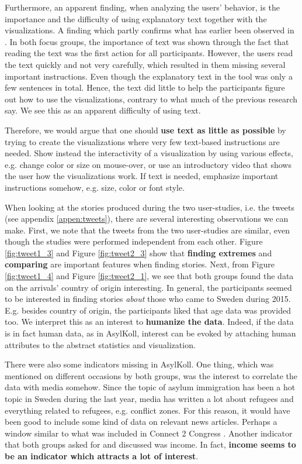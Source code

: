\documentclass{acmtog} %
\begin{document}
Furthermore, an apparent finding, when analyzing the users' behavior, is the importance and the difficulty of using explanatory text together with the visualizations. A finding which partly confirms what has earlier been observed in \citet{borkin2016beyond,segel2010narrative}. In both focus groups, the importance of text was shown through the fact that reading the text was the first action for all participants. However, the users read the text quickly and not very carefully, which resulted in them missing several important instructions. Even though the explanatory text in the tool was only a few sentences in total. Hence, the text did little to help the participants figure out how to use the visualizations, contrary to what much of the previous research say. We see this as an apparent difficulty of using text.

Therefore, we would argue that one should \textbf{use text as little as possible} by trying to create the visualizations where very few text-based instructions are needed. Show instead the interactivity of a visualization by using various effects, e.g. change color or size on mouse-over, or use an introductory video that shows the user how the visualizations work. If text is needed, emphasize important instructions somehow, e.g. size, color or font style.

When looking at the stories produced during the two user-studies, i.e. the tweets (see appendix \ref{appen:tweets}), there are several interesting observations we can make. First, we note that the tweets from the two user-studies are similar, even though the studies were performed independent from each other. Figure \ref{fig:tweet1_3} and Figure \ref{fig:tweet2_3} show that \textbf{finding extremes} and \textbf{comparing} are important features when finding stories. Next, from Figure \ref{fig:tweet1_4} and Figure \ref{fig:tweet2_1}, we see that both groups found the data on the arrivals' country of origin interesting. In general, the participants seemed to be interested in finding stories \emph{about} those who came to Sweden during 2015. E.g. besides country of origin, the participants liked that age data was provided too. We interpret this as an interest to \textbf{humanize the data}. Indeed, if the data is in fact human data, as in AsylKoll, interest can be evoked by attaching human attributes to the abstract statistics and visualization.

There were also some indicators missing in AsylKoll. One thing, which was mentioned on different occasions by both groups, was the interest to correlate the data with media somehow. Since the topic of asylum immigration has been a hot topic in Sweden during the last year, media has written a lot about refugees and everything related to refugees, e.g. conflict zones. For this reason, it would have been good to include some kind of data on relevant news articles. Perhaps a window similar to what was included in Connect 2 Congress \cite{kinnaird2010connect}. Another indicator that both groups asked for and discussed was income. In fact, \textbf{income seems to be an indicator which attracts a lot of interest}.
\end{document}
